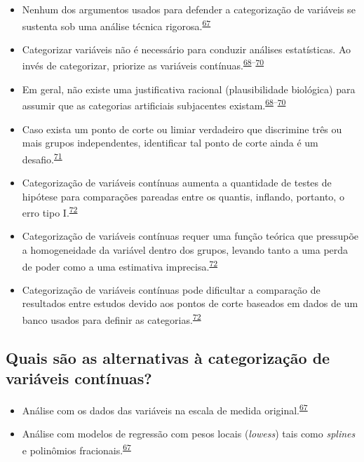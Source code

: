 \documentclass[
  a4paper,
]{book}
\begin{document}
\begin{itemize}
\item
  Nenhum dos argumentos usados para defender a categorização de variáveis se sustenta sob uma análise técnica rigorosa.\textsuperscript{\protect\hyperlink{ref-MacCallum2002}{67}}
\item
  Categorizar variáveis não é necessário para conduzir análises estatísticas. Ao invés de categorizar, priorize as variáveis contínuas.\textsuperscript{\protect\hyperlink{ref-Altman2006}{68}--\protect\hyperlink{ref-Collins2016}{70}}
\item
  Em geral, não existe uma justificativa racional (plausibilidade biológica) para assumir que as categorias artificiais subjacentes existam.\textsuperscript{\protect\hyperlink{ref-Altman2006}{68}--\protect\hyperlink{ref-Collins2016}{70}}
\item
  Caso exista um ponto de corte ou limiar verdadeiro que discrimine três ou mais grupos independentes, identificar tal ponto de corte ainda é um desafio.\textsuperscript{\protect\hyperlink{ref-Prince2017}{71}}
\item
  Categorização de variáveis contínuas aumenta a quantidade de testes de hipótese para comparações pareadas entre os quantis, inflando, portanto, o erro tipo I.\textsuperscript{\protect\hyperlink{ref-Bennette2012}{72}}
\item
  Categorização de variáveis contínuas requer uma função teórica que pressupõe a homogeneidade da variável dentro dos grupos, levando tanto a uma perda de poder como a uma estimativa imprecisa.\textsuperscript{\protect\hyperlink{ref-Bennette2012}{72}}
\item
  Categorização de variáveis contínuas pode dificultar a comparação de resultados entre estudos devido aos pontos de corte baseados em dados de um banco usados para definir as categorias.\textsuperscript{\protect\hyperlink{ref-Bennette2012}{72}}
\end{itemize}

\hypertarget{quais-suxe3o-as-alternativas-uxe0-categorizauxe7uxe3o-de-variuxe1veis-contuxednuas}{%
\subsection{Quais são as alternativas à categorização de variáveis contínuas?}\label{quais-suxe3o-as-alternativas-uxe0-categorizauxe7uxe3o-de-variuxe1veis-contuxednuas}}

\begin{itemize}
\item
  Análise com os dados das variáveis na escala de medida original.\textsuperscript{\protect\hyperlink{ref-MacCallum2002}{67}}
\item
  Análise com modelos de regressão com pesos locais (\emph{lowess}) tais como \emph{splines} e polinômios fracionais.\textsuperscript{\protect\hyperlink{ref-MacCallum2002}{67}}
\end{itemize}
\end{document}
